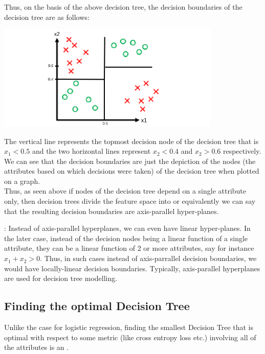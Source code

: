 Thus, on the basis of the above decision tree, the decision boundaries of the decision tree are as follows:
\begin{center}
  \includegraphics[width=0.8\textwidth]{images/05_09.png}
\end{center}

The vertical line represents the topmost decision node of the decision tree that is $x_{1} < 0.5$ and the two horizontal lines represent $x_{2} < 0.4$ and $x_{2} > 0.6$ respectively. We can see that the decision boundaries are just the depiction of the nodes (the attributes based on which decisions were taken) of the decision tree when plotted on a graph. \\

Thus, as seen above if nodes of the decision tree depend on a single attribute only, then decision trees divide the feature space into  or equivalently we can say that the resulting decision boundaries are axis-parallel hyper-planes.

\begin{mdframed}
  : Instead of axis-parallel hyperplanes, we can even have linear hyper-planes. In the later case, instead of the decision nodes being a linear function of a single attribute, they can be a linear function of 2 or more attributes, say for instance $x_{1} + x_{2}>0$. Thus, in such cases instead of axis-parrallel decision boundaries, we would have locally-linear decision boundaries.
  Typically, axis-parallel hyperplanes are used for decision tree modelling.
\end{mdframed}

\subsection{Finding the optimal Decision Tree}
Unlike the case for logistic regression, finding the smallest Decision Tree that is optimal with respect to some metric (like cross entropy loss etc.) involving all of the attributes is an .

